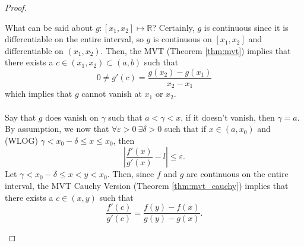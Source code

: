 \documentclass{article}
\newcommand{\R}{\mathbb{R}}
\newcommand{\?}{\stackrel{?}{=}}
\theoremstyle{definition} %
\begin{document}
\begin{itemize}
\begin{proof}
\begin{center}
        \end{center}
        What can be said about $g: [x_1, x_2] \mapsto \R$? Certainly, $g$ is continuous since it is differentiable on the entire interval, so $g$ is continuous on $[x_1, x_2]$ and differentiable on $(x_1, x_2)$. Then, the MVT (Theorem \ref{thm:mvt}) implies that there exists a $c \in (x_1, x_2) \subset (a, b)$ such that
        $$0 \neq g'(c) = \frac{g(x_2) - g(x_1)}{x_2 - x_1}$$
        which implies that $g$ cannot vanish at $x_1$ or $x_2$. \\\\
        Say that $g$ does vanish on $\gamma$ such that $a < \gamma < x$, if it doesn't vanish, then $\gamma = a$. By assumption, we now that $\forall \varepsilon > 0 \ \exists \delta > 0$ such that if $x \in (a, x_0)$ and (WLOG) $\gamma < x_0 - \delta \leq x \leq x_0$, then
        $$\left|\frac{f'(x)}{g'(x)} - l\right| \leq \varepsilon.$$
        Let $\gamma < x_0 - \delta \leq x < y < x_0$. Then, since $f$ and $g$ are continuous on the entire interval, the MVT Cauchy Version (Theorem \ref{thm:mvt_cauchy}) implies that there exists a $c \in (x, y)$ such that
        $$\frac{f'(c)}{g'(c)} = \frac{f(y) - f(x)}{g(y) - g(x)}.$$
        \begin{center}
\end{center}
\end{proof}
\end{itemize}
\end{document}
